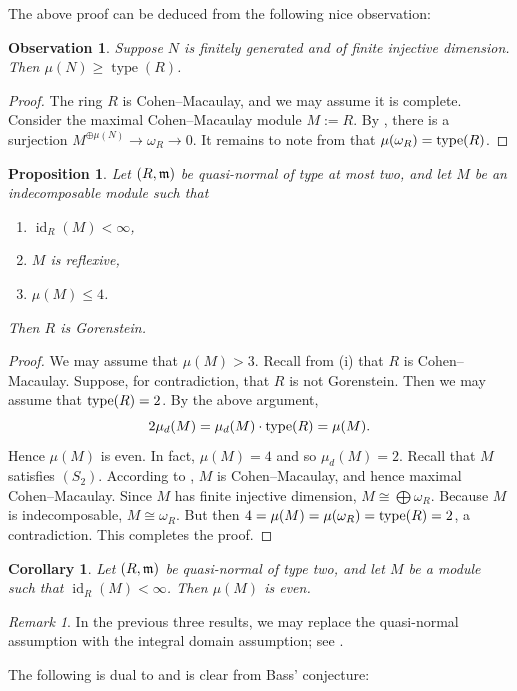\documentclass[10. pt,a4paper]{amsart}
\newtheorem{proposition}[theorem]{Proposition}
\newtheorem{corollary}[theorem]{Corollary}
\newtheorem{observation}[theorem]{Observation}
\theoremstyle{definition}
\theoremstyle{remark}
\newtheorem{remark}[theorem]{Remark}\newtheorem{fact}[theorem]{Fact}
\newcommand{\id}{\operatorname{id}}
\newcommand{\fm}{\frak{m}}
\begin{document}
The above proof can be deduced from the following nice observation:

\begin{observation}
	Suppose $N$ is finitely generated and of finite injective dimension. Then $\mu(N) \geq \operatorname{type}(R)$.
\end{observation}

\begin{proof}
	The ring $R$ is Cohen--Macaulay, and we may assume it is complete. Consider the maximal Cohen--Macaulay module $M := R$. By \cite[Corollary 3.15]{celp}, there is a surjection $M^{\oplus \mu(N)} \to \omega_R \to 0$. It remains to note from \cite[3.3.11(c)]{BH} that $\mu(\omega_R) = \operatorname{type}(R)$.
\end{proof}
\begin{proposition}\label{pqn}
	Let $(R,\fm)$ be quasi-normal of type at most two, and let $M$ be an indecomposable module such that
	\begin{enumerate}
		\item[(i)] $\id_R(M) < \infty$,
		\item[(ii)] $M$ is reflexive,
		\item[(iii)] $\mu(M) \leq 4$.
	\end{enumerate}
	Then $R$ is Gorenstein.
\end{proposition}

\begin{proof}
	We may assume that $\mu(M) > 3$. Recall from (i) that $R$ is Cohen--Macaulay. Suppose, for contradiction, that $R$ is not Gorenstein. Then we may assume that $\operatorname{type}( R) = 2$. By the above argument,
	\[
	2\mu_d(M) = \mu_d(M) \cdot \operatorname{type}( R) = \mu(M).
	\]
	Hence $\mu(M)$ is even. In fact, $\mu(M) = 4$ and so $\mu_d(M) = 2$. Recall that $M$ satisfies $(S_2)$. According to \cite[Theorem 3]{Ao}, $M$ is Cohen--Macaulay, and hence maximal Cohen--Macaulay. Since $M$ has finite injective dimension, $M \cong \bigoplus \omega_R$. Because $M$ is indecomposable, $M \cong \omega_R$. But then $4 = \mu(M) = \mu(\omega_R) = \operatorname{type}(R) = 2$, a contradiction. This completes the proof.
\end{proof}

\begin{corollary}
	Let $(R,\fm)$ be quasi-normal of type two, and let $M$ be a module such that $\id_R(M) < \infty$. Then $\mu(M)$ is even.
\end{corollary}

\begin{remark}
	In the previous three results, we may replace the quasi-normal assumption with the integral domain assumption; see \cite[Corollary 5.11]{finitsup}.
\end{remark}
The following is dual to \cite[6.2.4]{int1} and is clear from Bass'  conjecture:
\end{document}
